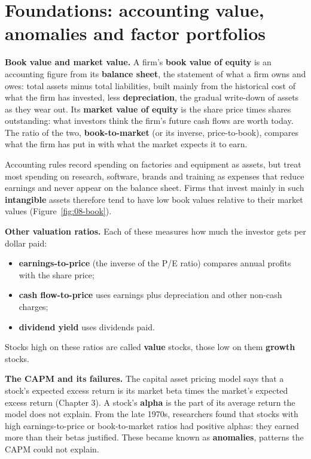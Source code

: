 \section{Foundations: accounting value, anomalies and factor portfolios}
\label{sec:08-foundations}

\textbf{Book value and market value.} A firm's \textbf{book value of equity} is an accounting figure from its \textbf{balance sheet}, the statement of what a firm owns and owes: total assets minus total liabilities, built mainly from the historical cost of what the firm has invested, less \textbf{depreciation}, the gradual write-down of assets as they wear out. Its \textbf{market value of equity} is the share price times shares outstanding: what investors think the firm's future cash flows are worth today. The ratio of the two, \textbf{book-to-market} (or its inverse, price-to-book), compares what the firm has put in with what the market expects it to earn.

Accounting rules record spending on factories and equipment as assets, but treat most spending on research, software, brands and training as expenses that reduce earnings and never appear on the balance sheet. Firms that invest mainly in such \textbf{intangible} assets therefore tend to have low book values relative to their market values (Figure~\ref{fig:08-book}).

\textbf{Other valuation ratios.} Each of these measures how much the investor gets per dollar paid:

\begin{itemize}
  \item \textbf{earnings-to-price} (the inverse of the P/E ratio) compares annual profits with the share price;
  \item \textbf{cash flow-to-price} uses earnings plus depreciation and other non-cash charges;
  \item \textbf{dividend yield} uses dividends paid.
\end{itemize}

Stocks high on these ratios are called \textbf{value} stocks, those low on them \textbf{growth} stocks.

\textbf{The CAPM and its failures.} The capital asset pricing model says that a stock's expected excess return is its market beta times the market's expected excess return (Chapter 3). A stock's \textbf{alpha} is the part of its average return the model does not explain. From the late 1970s, researchers found that stocks with high earnings-to-price or book-to-market ratios had positive alphas: they earned more than their betas justified. These became known as \textbf{anomalies}, patterns the CAPM could not explain.


